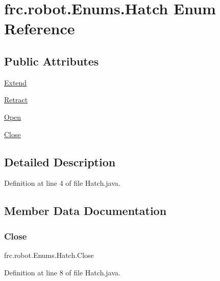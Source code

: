 \hypertarget{enumfrc_1_1robot_1_1Enums_1_1Hatch}{}\section{frc.\+robot.\+Enums.\+Hatch Enum Reference}
\label{enumfrc_1_1robot_1_1Enums_1_1Hatch}
\subsection*{Public Attributes}
\begin{DoxyCompactItemize}
\item 
\hyperlink{enumfrc_1_1robot_1_1Enums_1_1Hatch_aa9182f52be77e783bb38e7cfbf5bb700}{Extend}
\item 
\hyperlink{enumfrc_1_1robot_1_1Enums_1_1Hatch_ac4881a7e4ca2bc7c64aa8acd0da91d6e}{Retract}
\item 
\hyperlink{enumfrc_1_1robot_1_1Enums_1_1Hatch_aba378e125bbd0e4206aa27ab9bc51b0b}{Open}
\item 
\hyperlink{enumfrc_1_1robot_1_1Enums_1_1Hatch_ad9de6151d633f63ba3cb50aaeba1afd0}{Close}
\end{DoxyCompactItemize}


\subsection{Detailed Description}


Definition at line 4 of file Hatch.\+java.



\subsection{Member Data Documentation}
\mbox{\label{enumfrc_1_1robot_1_1Enums_1_1Hatch_ad9de6151d633f63ba3cb50aaeba1afd0}} 
\subsubsection{\texorpdfstring{Close}{Close}}
{\footnotesize\ttfamily frc.\+robot.\+Enums.\+Hatch.\+Close}



Definition at line 8 of file Hatch.\+java.

